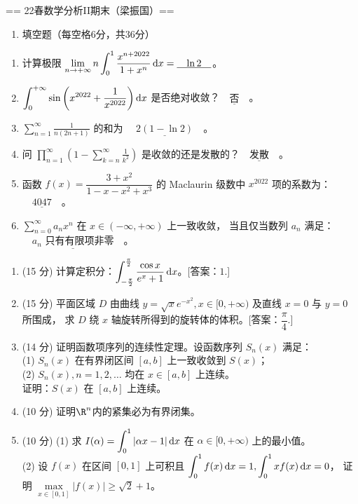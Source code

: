 == 22春数学分析II期末（梁振国）==
\begin{enumerate}
\item 填空题（每空格6分，共36分）
\end{enumerate}
\begin{enumerate}[label=(\arabic*)]
\item 计算极限 $\displaystyle\lim_{n \rightarrow+\infty} n \int_0^1 \frac{x^{n+2022}}{1+x^n}\,{\rm d}x=\underline{\quad \ln 2 \quad}$。
\item $\displaystyle\int_0^{+\infty} \sin \left(x^{2022}+\frac{1}{x^{2022}}\right) {\rm d}x$ 是否绝对收敛？$\underline{\quad\text{否}\quad}$。
\item $\displaystyle\sum_{n=1}^{\infty} \frac{1}{n(2n+1)}$ 的和为 $\underline{\quad 2(1-\ln 2) \quad}$。
\item 问 $\displaystyle\prod_{n=1}^{\infty}\left(1-\sum_{k=n}^{\infty} \frac{1}{k^2}\right)$ 是收敛的还是发散的？$\underline{\quad\text{发散}\quad}$。
\item 函数 $f(x)=\dfrac{3+x^2}{1-x-x^2+x^3}$ 的 Maclaurin 级数中 $x^{2022}$ 项的系数为：$\underline{\quad 4047 \quad}$。
\item $\displaystyle\sum_{n=0}^{\infty} a_n x^n$ 在 $x\in(-\infty,+\infty)$ 上一致收敛，
当且仅当数列 $a_n$ 满足：$\underline{\quad a_n\text{ 只有有限项非零} \quad}$。
\end{enumerate}
\begin{enumerate}
\item (15 分) 计算定积分：$\displaystyle\int_{-\frac{\pi}{2}}^{\frac{\pi}{2}} \frac{\cos x}{e^x+1}\,{\rm d}x$。[答案：$1$.]

\item (15 分) 平面区域 $D$ 由曲线 $y=\sqrt{x} e^{-x^2}, x\in[0,+\infty)$ 及直线 $x=0$ 与 $y=0$ 所围成，
求 $D$ 绕 $x$ 轴旋转所得到的旋转体的体积。[答案：$\dfrac{\pi}{4}$.]

\item (14 分) 证明函数项序列的连续性定理。设函数序列 $S_n(x)$ 满足：\\
(1) $S_n(x)$ 在有界闭区间 $[a, b]$ 上一致收敛到 $S(x)$；\\
(2) $S_n(x), n=1,2,\ldots$ 均在 $x \in[a, b]$ 上连续。\\
证明：$S(x)$ 在 $[a, b]$ 上连续。

\item (10 分) 证明$\R^n$内的紧集必为有界闭集。

\item (10 分) (1) 求 $\displaystyle I(\alpha)=\int_0^1|\alpha x-1|\,{\rm d}x$ 在 $\alpha \in[0,+\infty)$ 上的最小值。\\
(2) 设 $f(x)$ 在区间 $[0,1]$ 上可积且 $\displaystyle\int_0^1 f(x)\,{\rm d}x=1, \int_0^1 xf(x)\,{\rm d}x=0$，
证明 $\max\limits_{x\in[0,1]}|f(x)| \geq \sqrt{2}+1$。
\end{enumerate}

